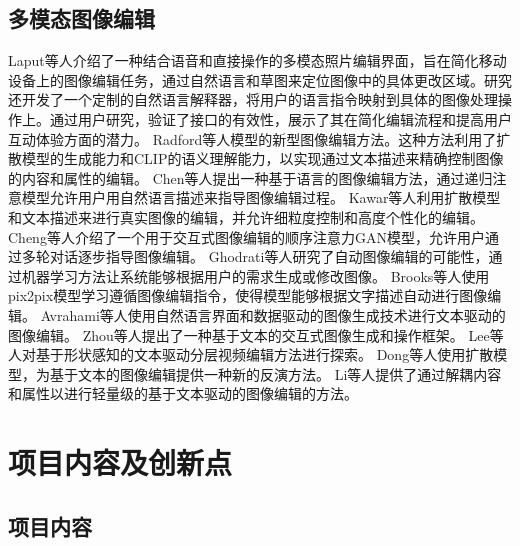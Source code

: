 \documentclass[a4paper,AutoFakeBold,oneside,12pt]{book}
\begin{document}
\subsection{多模态图像编辑}
Laput等人\cite{laput2013pixeltone}介绍了一种结合语音和直接操作的多模态照片编辑界面，旨在简化移动设备上的图像编辑任务，通过自然语言和草图来定位图像中的具体更改区域。研究还开发了一个定制的自然语言解释器，将用户的语言指令映射到具体的图像处理操作上。通过用户研究，验证了接口的有效性，展示了其在简化编辑流程和提高用户互动体验方面的潜力。
Radford等人\cite{radford2021learning}模型的新型图像编辑方法。这种方法利用了扩散模型的生成能力和CLIP的语义理解能力，以实现通过文本描述来精确控制图像的内容和属性的编辑。
Chen等人\cite{chen2018language}提出一种基于语言的图像编辑方法，通过递归注意模型允许用户用自然语言描述来指导图像编辑过程。
Kawar等人\cite{kawar2023imagic}利用扩散模型和文本描述来进行真实图像的编辑，并允许细粒度控制和高度个性化的编辑。
Cheng等人\cite{cheng2020sequential}介绍了一个用于交互式图像编辑的顺序注意力GAN模型，允许用户通过多轮对话逐步指导图像编辑。
Ghodrati等人\cite{ghodrati2015towards}研究了自动图像编辑的可能性，通过机器学习方法让系统能够根据用户的需求生成或修改图像。
Brooks等人\cite{brooks2023instructpix2pix}使用pix2pix模型学习遵循图像编辑指令，使得模型能够根据文字描述自动进行图像编辑。
Avrahami等人\cite{avrahami2022blended}使用自然语言界面和数据驱动的图像生成技术进行文本驱动的图像编辑。
Zhou等人\cite{zhou2022tigan}提出了一种基于文本的交互式图像生成和操作框架。
Lee等人\cite{lee2023shape}对基于形状感知的文本驱动分层视频编辑方法进行探索。
Dong等人\cite{dong2023prompt}使用扩散模型，为基于文本的图像编辑提供一种新的反演方法。
Li等人\cite{li2023lightweight}提供了通过解耦内容和属性以进行轻量级的基于文本驱动的图像编辑的方法。

\section{项目内容及创新点}
\subsection{项目内容}


\end{document}
